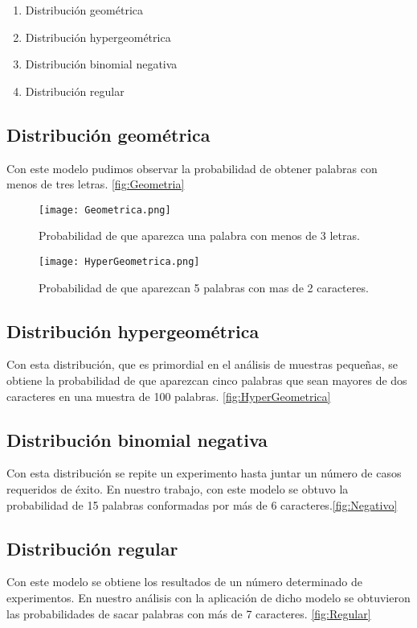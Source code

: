\documentclass[]{article}
\begin{document}
\begin{enumerate}
	\item Distribución geométrica
	\item Distribución hypergeométrica
	\item Distribución binomial negativa
	\item Distribución regular
\end{enumerate}


\subsection{Distribución geométrica}
Con este modelo pudimos observar la probabilidad de obtener palabras con menos de tres letras. 
\autoref{fig:Geometria}

\begin{figure}[b]
    \centering
    \texttt{[image: Geometrica.png]}    \caption{Probabilidad de que aparezca una palabra con  menos de 3 letras.}
    \label{fig:Geometria}
\end{figure}

\begin{figure}[b]
    \centering
    \texttt{[image: HyperGeometrica.png]}    \caption{Probabilidad de que aparezcan 5 palabras con mas de 2 caracteres.}
    \label{fig:HyperGeometrica}
\end{figure}

\subsection{Distribución hypergeométrica}
Con esta distribución, que es primordial en el análisis de muestras pequeñas, se obtiene la probabilidad de que aparezcan cinco palabras que sean mayores de dos caracteres en una muestra de 100 palabras. \autoref{fig:HyperGeometrica}

\subsection{Distribución binomial negativa}
Con esta distribución se repite un experimento hasta juntar un número de casos requeridos de éxito. En nuestro trabajo, con este modelo se obtuvo la probabilidad de 15 palabras conformadas por más de 6 caracteres.\autoref{fig:Negativo}
\subsection{Distribución regular}
Con este modelo se obtiene los resultados de un número determinado de experimentos. En nuestro análisis con la aplicación de dicho modelo se obtuvieron las probabilidades de sacar palabras con más de 7 caracteres. \autoref{fig:Regular}
\end{document}
